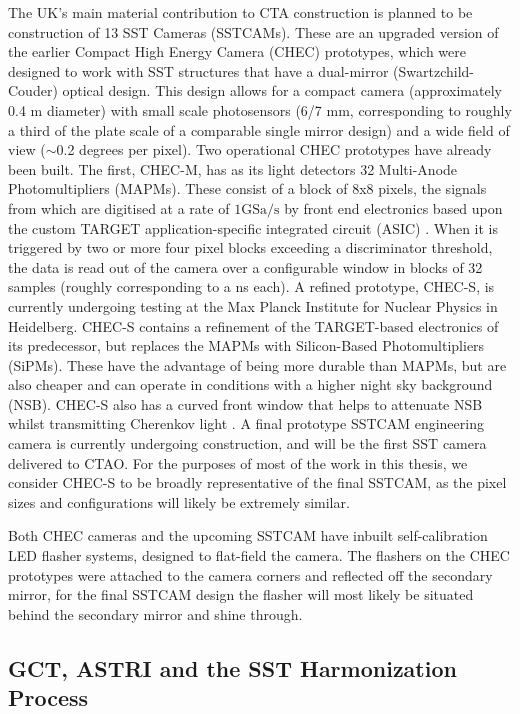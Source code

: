 The UK's main material contribution to CTA construction is planned to be construction of 13 SST Cameras (SSTCAMs). These are an upgraded version of the earlier Compact High Energy Camera (CHEC) prototypes, which were designed to work with SST structures that have a dual-mirror (Swartzchild-Couder) optical design. This design allows for a compact camera (approximately 0.4 m diameter) with small scale photosensors (6/7 mm, corresponding to roughly a third of the plate scale of a comparable single mirror design) and a wide field of view ($\sim$0.2 degrees per pixel).  Two operational CHEC prototypes have already been built. The first, CHEC-M, has as its light detectors 32 Multi-Anode Photomultipliers (MAPMs)\cite{tomthesis}. These consist of a block of 8x8 pixels, the signals from which are digitised at a rate of $1\mathrm{GSa}/\mathrm{s}$ \cite{tomthesis} by front end electronics based upon the custom TARGET application-specific integrated circuit (ASIC) \cite{checmpaper}. When it is triggered by two or more four pixel blocks exceeding a discriminator threshold, the data is read out of the camera over a configurable window in blocks of 32 samples (roughly corresponding to a ns each). A refined prototype, CHEC-S, is currently undergoing testing at the Max Planck Institute for Nuclear Physics in Heidelberg. CHEC-S contains a refinement of the TARGET-based electronics of its predecessor, but replaces the MAPMs with Silicon-Based Photomultipliers (SiPMs). These have the advantage of being more durable than MAPMs, but are also cheaper and can operate in conditions with a higher night sky background (NSB). CHEC-S also has a curved front window that helps to attenuate NSB whilst transmitting Cherenkov light \cite{ssticrc}. A final prototype SSTCAM engineering camera is currently undergoing construction, and will be the first SST camera delivered to CTAO. For the purposes of most of the work in this thesis, we consider CHEC-S to be broadly representative of the final SSTCAM, as the pixel sizes and configurations will likely be extremely similar.

Both CHEC cameras and the upcoming SSTCAM have inbuilt self-calibration LED flasher systems, designed to flat-field the camera. The flashers on the CHEC prototypes were attached to the camera corners and reflected off the secondary mirror, for the final SSTCAM design the flasher will most likely be situated behind the secondary mirror and shine through. 

\subsection{GCT, ASTRI and the SST Harmonization Process}

